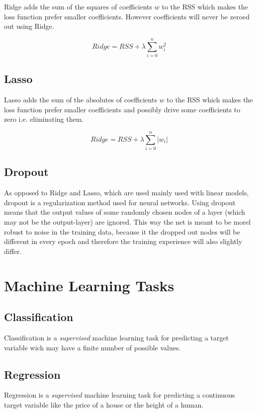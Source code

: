 Ridge adds the sum of the squares of coefficients $w$ to the RSS which makes the loss function prefer smaller coefficients. However coefficients will never be zeroed out using Ridge.

$$
    Ridge = RSS + \lambda \sum_{i=0}^{n} w_{i}^{2}
$$

\subsection{Lasso}

Lasso adds the sum of the absolutes of coefficients $w$ to the RSS which makes the loss function prefer smaller coefficients and possibly drive some coefficients to zero i.e. eliminating them.

$$
    Ridge = RSS + \lambda \sum_{i=0}^{n} |w_{i}|
$$


\subsection{Dropout}

As opposed to Ridge and Lasso, which are used mainly used with linear models, dropout is a regularization method used for neural networks. Using dropout means that the output values of some randomly chosen nodes of a layer (which may not be the output-layer) are ignored. This way the net is meant to be morel robust to noise in the training data, because it the dropped out nodes will be different in every epoch and therefore the training experience will also slightly differ.

\section{Machine Learning Tasks}

\subsection{Classification}

Classification is a \textit{supervised} machine learning task for predicting a target variable wich may have a finite number of possible values.

\subsection{Regression}

Regression is a \textit{supervised} machine learning task for predicting a continuous target variable like the price of a house or the height of a human.


